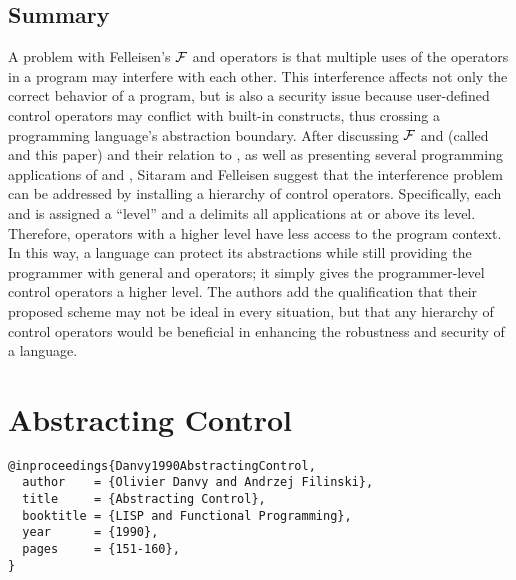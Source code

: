 \documentclass[letterpaper]{llncs}
\begin{document}
\subsection*{Summary}
A problem with Felleisen's $ \mathcal{F} $ and \prompt operators is that multiple uses of the operators in a program may interfere with each other. This interference affects not only the correct behavior of a program, but is also a security issue because user-defined control operators may conflict with built-in constructs, thus crossing a programming language's abstraction boundary. After discussing $ \mathcal{F} $ and \prompt (called \ctrl and \run this paper) and their relation to \callcc, as well as presenting several programming applications of \ctrl and \run, Sitaram and Felleisen suggest that the interference problem can be addressed by installing a hierarchy of control operators. Specifically, each \ctrl and \run is assigned a ``level'' and a \run delimits all \ctrl applications at or above its level. Therefore, operators with a higher level have less access to the program context. In this way, a language can protect its abstractions while still providing the programmer with general \ctrl and \run operators; it simply gives the programmer-level control operators a higher level. The authors add the qualification that their proposed scheme may not be ideal in every situation, but that any hierarchy of control operators would be beneficial in enhancing the robustness and security of a language.


\section*{Abstracting Control}%

\begin{verbatim}
@inproceedings{Danvy1990AbstractingControl,
  author    = {Olivier Danvy and Andrzej Filinski},
  title     = {Abstracting Control},
  booktitle = {LISP and Functional Programming},
  year      = {1990},
  pages     = {151-160},
}
\end{verbatim}
\end{document}
